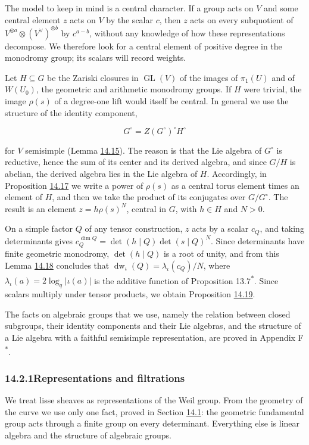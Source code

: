 \documentclass[11pt]{article}
\newcommand{\bpout}[1]{#1\textsuperscript{\hyperlink{bp-outside}{\ensuremath{\ast}}}}
\providecommand{\GL}{}\renewcommand{\GL}{\operatorname{GL}}
\begin{document}
The model to keep in mind is a central character. If a group acts on \(V\) and some central element \(z\) acts on \(V\) by the scalar \(c\), then \(z\) acts on every subquotient of \(V^{\otimes a}\otimes(V^\vee)^{\otimes b}\) by \(c^{a-b}\), without any knowledge of how these representations decompose. We therefore look for a central element of positive degree in the monodromy group; its scalars will record weights.

Let \(H\subseteq G\) be the Zariski closures in \(\GL(V)\) of the images of \(\pi_1(U)\) and of \(W(U_0)\), the geometric and arithmetic monodromy groups. If \(H\) were trivial, the image \(\rho(s)\) of a degree-one lift would itself be central. In general we use the structure of the identity component,

\[
G^\circ=Z(G^\circ)^\circ H^\circ
\]

for \(V\) semisimple (Lemma \hyperref[bp49]{14.15}). The reason is that the Lie algebra of \(G^\circ\) is reductive, hence the sum of its center and its derived algebra, and since \(G/H\) is abelian, the derived algebra lies in the Lie algebra of \(H\). Accordingly, in Proposition \hyperref[bp54]{14.17} we write a power of \(\rho(s)\) as a central torus element times an element of \(H\), and then we take the product of its conjugates over \(G/G^\circ\). The result is an element \(z=h\rho(s)^N\), central in \(G\), with \(h\in H\) and \(N>0\).

On a simple factor \(Q\) of any tensor construction, \(z\) acts by a scalar \(c_Q\), and taking determinants gives \(c_Q^{\dim Q}=\det(h\mid Q)\det(s\mid Q)^N\). Since determinants have finite geometric monodromy, \(\det(h\mid Q)\) is a root of unity, and from this Lemma \hyperref[bp58]{14.18} concludes that \(\operatorname{dw}_\iota(Q)=\lambda_\iota(c_Q)/N\), where \(\lambda_\iota(a)=2\log_q|\iota(a)|\) is the additive function of Proposition \bpout{13.7}. Since scalars multiply under tensor products, we obtain Proposition \hyperref[bp61]{14.19}.

The facts on algebraic groups that we use, namely the relation between closed subgroups, their identity components and their Lie algebras, and the structure of a Lie algebra with a faithful semisimple representation, are proved in Appendix \bpout{F}.

\subsubsection*{\texorpdfstring{14.2.1\quad Representations and filtrations}{14.2.1 Representations and filtrations}}
\label{bp33}%
\label{bp34}%
We treat lisse sheaves as representations of the Weil group. From the geometry of the curve we use only one fact, proved in Section \hyperref[bp3]{14.1}: the geometric fundamental group acts through a finite group on every determinant. Everything else is linear algebra and the structure of algebraic groups.
\end{document}
